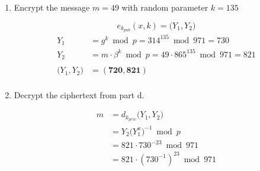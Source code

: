 \documentclass[12pt]{article}
\newenvironment{answer}
{ \begin{tcolorbox}[halign=left]
    }
    {  
  \end{tcolorbox}
}
\begin{document}
\begin{enumerate}
\begin{enumerate}
\begin{answer}
\begin{align*}
      \end{align*}
      \begin{center}
        (next page)
      \end{center}
    \end{answer}
    \newpage
    \begin{answer}
      \begin{align*}
        &s_0: \text{  }971 = \bm{2}(364) + 243 &p_0 &= 0 \text{ (given)}\\
        &s_1: \text{  }364 = \bm{1}(243) + 121 &p_1 &= 1 \text{ (given)}\\
        &s_2: \text{  }243 = \bm{2}(121) + 1 &p_2 &= p_0 - p_1(q_0) \bmod 971 \\ 
        & & &= 0 - 1(2) \bmod 971 = 969 \\
        &s_3: \text{  }121 = \bm{121}(1) + 0 &p_3 &= p_1 - p_2(q_1) \bmod 971 \\
        & & &= 1 - 969(1) \bmod 971 = 3 \\
        & &p_4 &= p_2 - p_3(q_2) \bmod 971 \\
        & & &= 969 - 3(2) \bmod 971 = \bm{963}
      \end{align*}
      \[ m = 448 \cdot (963)^{23} \bmod 971 = 49\]
    \end{answer}
  \item Encrypt the message $m = 49$ with random parameter $k = 135$ 
    \begin{answer}
      \[ e_{k_{pub}}(x,k) = \big(Y_1,Y_2\big) \]
      \begin{align*}        
        Y_1 &= g^k \bmod p = 314^{135} \bmod 971 = 730 \\
        Y_2 &= m \cdot \beta^k \bmod p = 49 \cdot 865^{135} \bmod 971 = 821 \\
        & \\
        \big(Y_1, Y_2\big) &= (\bm{720,821}) \\
      \end{align*}
    \end{answer}
  \item Decrypt the ciphertext from part d.  
    \begin{answer}
      \begin{align*}
        m &= d_{k_{priv}}\big(Y_1,Y_2\big) \\
          &= Y_2\big(Y^x_1\big)^{-1} \bmod p \\
          &= 821 \cdot 730^{-23} \bmod 971 \\        
          &= 821 \cdot (730^{-1})^{23} \bmod 971 \\

\end{align*}
\end{answer}
\end{enumerate}
\end{enumerate}
\end{document}
